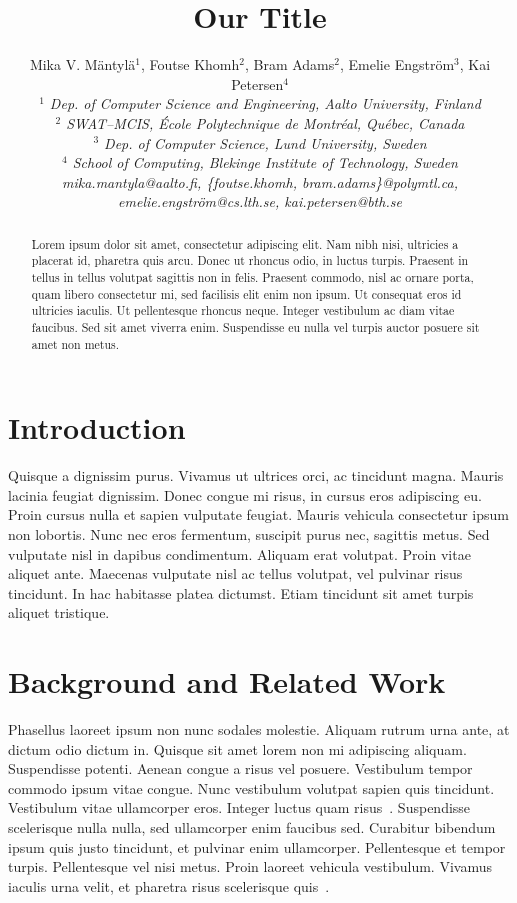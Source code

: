 \documentclass[10pt, conference]{IEEEtran}
\title{Our Title}
\author{Mika V. M\"antyl\"a$^{1}$, Foutse Khomh$^{2}$, Bram Adams$^{2}$, Emelie Engstr\"om$^{3}$, Kai Petersen$^{4}$
    \\
    \emph{$^{1}$ Dep. of Computer Science and Engineering, Aalto University, Finland}
    \\
    \emph{$^{2}$ SWAT--MCIS, \'{E}cole Polytechnique de Montr\'{e}al, Qu\'{e}bec, Canada}
    \\
    \emph{$^{3}$ Dep. of Computer Science, Lund University, Sweden}
    \\
    \emph{$^{4}$ School of Computing, Blekinge Institute of Technology, Sweden}
    \\
    \emph{mika.mantyla@aalto.fi, \{foutse.khomh, bram.adams\}@polymtl.ca, emelie.engstr\"om@cs.lth.se, kai.petersen@bth.se }}
\begin{document}
\maketitle

\begin{abstract}
Lorem ipsum dolor sit amet, consectetur adipiscing elit. Nam nibh nisi, ultricies a placerat id, pharetra quis arcu. Donec ut rhoncus odio, in luctus turpis. Praesent in tellus in tellus volutpat sagittis non in felis. Praesent commodo, nisl ac ornare porta, quam libero consectetur mi, sed facilisis elit enim non ipsum. Ut consequat eros id ultricies iaculis. Ut pellentesque rhoncus neque. Integer vestibulum ac diam vitae faucibus. Sed sit amet viverra enim. Suspendisse eu nulla vel turpis auctor posuere sit amet non metus.
\end{abstract}

\section{Introduction}
\label{sec:introduction}

Quisque a dignissim purus. Vivamus ut ultrices orci, ac tincidunt magna. Mauris lacinia feugiat dignissim. Donec congue mi risus, in cursus eros adipiscing eu. Proin cursus nulla et sapien vulputate feugiat. Mauris vehicula consectetur ipsum non lobortis. Nunc nec eros fermentum, suscipit purus nec, sagittis metus. Sed vulputate nisl in dapibus condimentum. Aliquam erat volutpat. Proin vitae aliquet ante. Maecenas vulputate nisl ac tellus volutpat, vel pulvinar risus tincidunt. In hac habitasse platea dictumst. Etiam tincidunt sit amet turpis aliquet tristique.

\section{Background and Related Work}
\label{sec:backgr-relat-work}

Phasellus laoreet ipsum non nunc sodales molestie. Aliquam rutrum urna ante, at dictum odio dictum in. Quisque sit amet lorem non mi adipiscing aliquam. Suspendisse potenti. Aenean congue a risus vel posuere. Vestibulum tempor commodo ipsum vitae congue. Nunc vestibulum volutpat sapien quis tincidunt. Vestibulum vitae ullamcorper eros. Integer luctus quam risus~\cite{humble10}. Suspendisse scelerisque nulla nulla, sed ullamcorper enim faucibus sed. Curabitur bibendum ipsum quis justo tincidunt, et pulvinar enim ullamcorper. Pellentesque et tempor turpis. Pellentesque vel nisi metus. Proin laoreet vehicula vestibulum. Vivamus iaculis urna velit, et pharetra risus scelerisque quis~\cite{baysal11}.
\end{document}
